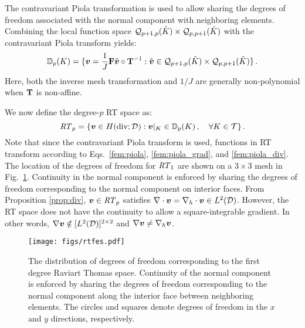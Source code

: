 \documentclass[../doc.tex]{subfiles}
\begin{document}
The contravariant Piola transformation is used to allow sharing the degrees of freedom associated with the normal component with neighboring elements. Combining the local function space $\mathcal{Q}_{p+1,p}(\hat{K})\times\mathcal{Q}_{p,p+1}(\hat{K})$ with the contravariant Piola transform yields: 
	\begin{equation}
		\mathbb{D}_p(K) = \{ \boldsymbol{v} = \frac{1}{J}\boldsymbol{\mathrm{F}}\hat{\boldsymbol{v}}\circ\boldsymbol{\mathrm{T}}^{-1} : \hat{\boldsymbol{v}} \in \mathcal{Q}_{p+1,p}(\hat{K}) \times \mathcal{Q}_{p,p+1}(\hat{K}) \} \,. 
	\end{equation}
Here, both the inverse mesh transformation and $1/J$ are generally non-polynomial when $\boldsymbol{\mathrm{T}}$ is non-affine. 

We now define the degree-$p$ RT space as: 
	\begin{equation}
		\mathit{RT}_p = \{ \boldsymbol{v} \in H(\operatorname{div};\mathcal{D}) : \boldsymbol{v}|_K \in \mathbb{D}_p(K) \,, \quad \forall K \in \mathcal{T} \} \,. 
	\end{equation}
Note that since the contravariant Piola transform is used, functions in RT transform according to Eqs.~\ref{fem:piola}, \ref{fem:piola_grad}, and \ref{fem:piola_div}. 
The location of the degrees of freedom for $\mathit{RT}_1$ are shown on a $3\times 3$ mesh in Fig.~\ref{fem:rtfes}. Continuity in the normal component is enforced by sharing the degrees of freedom corresponding to the normal component on interior faces. 
From Proposition \ref{prop:div}, $\boldsymbol{v} \in \mathit{RT}_p$ satisfies $\nabla\cdot\boldsymbol{v} = \nabla_h\cdot\boldsymbol{v} \in L^2(\mathcal{D})$. However, the RT space does not have the continuity to allow a square-integrable gradient. In other words, $\nabla\boldsymbol{v} \notin [L^2(\mathcal{D})]^{2\times 2}$ and $\nabla\boldsymbol{v} \neq \nabla_h\boldsymbol{v}$. 
\begin{figure}
\centering 
\texttt{[image: figs/rtfes.pdf]}
\caption{The distribution of degrees of freedom corresponding to the first degree Raviart Thomas space. Continuity of the normal component is enforced by sharing the degrees of freedom corresponding to the normal component along the interior face between neighboring elements. The circles and squares denote degrees of freedom in the $x$ and $y$ directions, respectively. }
\label{fem:rtfes}
\end{figure}
\end{document}
